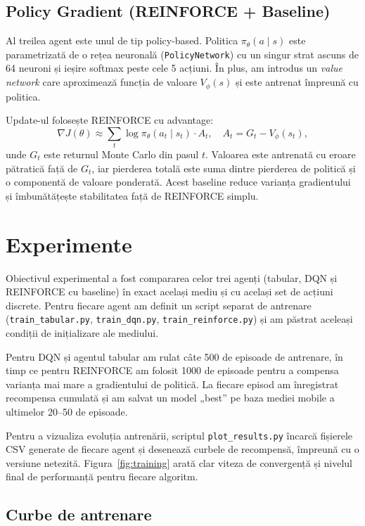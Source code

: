 \documentclass[11pt,a4paper]{article}
\begin{document}
\subsection{Policy Gradient (REINFORCE + Baseline)}

Al treilea agent este unul de tip policy-based. Politica $\pi_\theta(a\mid s)$ este
parametrizată de o rețea neuronală (\texttt{PolicyNetwork}) cu un singur strat ascuns de 64
neuroni și ieșire softmax peste cele 5 acțiuni. În plus, am introdus un \emph{value network}
care aproximează funcția de valoare $V_\phi(s)$ și este antrenat împreună cu politica.

Update-ul folosește REINFORCE cu advantage:
\[
\nabla J(\theta) \approx \sum_t \log \pi_\theta(a_t \mid s_t) \cdot A_t, \quad
A_t = G_t - V_\phi(s_t),
\]
unde $G_t$ este returnul Monte Carlo din pasul $t$. Valoarea este antrenată cu eroare pătratică
față de $G_t$, iar pierderea totală este suma dintre pierderea de politică și o componentă de
valoare ponderată. Acest baseline reduce varianța gradientului și îmbunătățește stabilitatea
față de REINFORCE simplu.

\section{Experimente}

Obiectivul experimental a fost compararea celor trei agenți (tabular, DQN și
REINFORCE cu baseline) în exact același mediu și cu același set de acțiuni
discrete. Pentru fiecare agent am definit un script separat de antrenare
(\texttt{train\_tabular.py}, \texttt{train\_dqn.py}, \texttt{train\_reinforce.py}) și am păstrat
aceleași condiții de inițializare ale mediului.

Pentru DQN și agentul tabular am rulat câte 500 de episoade de antrenare,
în timp ce pentru REINFORCE am folosit 1000 de episoade pentru a compensa
varianța mai mare a gradientului de politică. La fiecare episod am înregistrat
recompensa cumulată și am salvat un model „best” pe baza mediei mobile a
ultimelor 20--50 de episoade.

Pentru a vizualiza evoluția antrenării, scriptul \texttt{plot\_results.py} încarcă
fișierele CSV generate de fiecare agent și desenează curbele de recompensă,
împreună cu o versiune netezită. Figura~\ref{fig:training} arată clar viteza de
convergență și nivelul final de performanță pentru fiecare algoritm.

\subsection{Curbe de antrenare}
\end{document}
